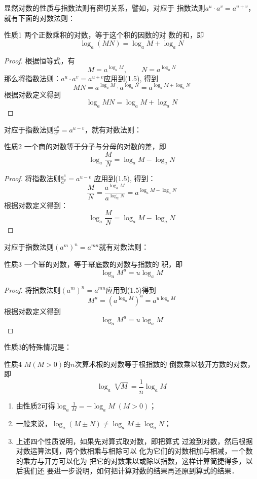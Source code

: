 显然对数的性质与指数法则有密切关系，譬如，对应于
指数法则$a^u\cdot a^v=a^{u+v}$，就有下面的对数法则：

\begin{blk}{性质1}
    两个正数乘积的对数，等于这个积的因数的对
数的和，即
\[\log_a(MN)=\log_a M+\log_a N\]
\end{blk}

\begin{proof}
    根据恒等式，有
    \begin{equation}
        M=a^{\log_a M},\qquad N=a^{\log_a N}
    \end{equation}
    那么将指数法则：$a^u\cdot a^v=a^{u+v}$应用到(1.5), 得到
\[MN=a^{\log_a M}\cdot a^{\log_a N}=a^{\log_a M+\log_a N}\]
    根据对数定义得到
    \[\log_a MN = \log_a M + \log_a N\]
\end{proof}    

对应于指数法则$\frac{a^u}{a^v}=a^{u-v}$，就有对数法则：
    
\begin{blk}{性质2}
    一个商的对数等于分子与分母的对数的差，即
    \[\log_a \frac{M}{N}=\log_a M-\log_a N\]
\end{blk}

\begin{proof}
将指数法则$\frac{a^u}{a^v}=a^{u-v}$
应用到(1.5), 得到：
\[\frac{M}{N}=\frac{a^{\log_a M}}{a^{\log_a N}}=a^{\log_a M-\log_a N}\]
根据对数定义得到：
\[\log_a\frac{M}{N}=\log_a M -\log_a N\]
\end{proof}    

对应于指数法则$(a^m)^n=a^{mn}$就有对数法则： 
\begin{blk}{性质3}
    一个幂的对数，等于幂底数的对数与指数的
积，即
\[\log_a M^u =u\log_a M\]
\end{blk}
  
\begin{proof}
    将指数法则$(a^m)^n=a^{mn}$应用到(1.5)得到
\[M^u=\left(a^{\log_a M}\right)^u=a^{u\log_a M}\]
根据对数定义得到
\[\log_a M^u = u\log_a M\]
\end{proof}
    
性质3的特殊情况是：

\begin{blk}{性质4}
 $M(M>0)$的$n$次算术根的对数等于根指数的
倒数乘以被开方数的对数，即
\[\log_a\sqrt[n]{M}=\frac{1}{n}\log_a M\]
\end{blk}

\begin{rmk}
    \begin{enumerate}
        \item 由性质2可得$\log_a\frac{1}{M}=-\log_a M\; (M>0)$；
        \item 一般来说，$\log_a(M\pm N)\ne \log_a M\pm \log_a N$；
        \item 上述四个性质说明，如果先对算式取对数，即把算式
        过渡到对数，然后根据对数运算法则，两个数相乘与相除可以
        化为它们的对数相加与相减，一个数的乘方与开方可以化为
        把它的对数乘以或除以指数，这样计算简捷得多，以后我们还
        要进一步说明，如何把计算对数的结果再还原到算式的结果．
    \end{enumerate}
\end{rmk}
    
